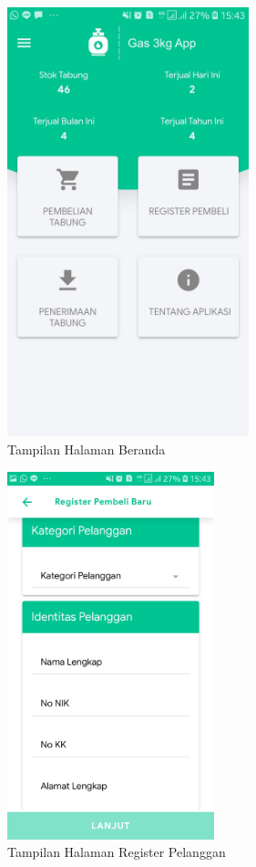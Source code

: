 	\begin{figure}[H]
		\center
		\includegraphics [width = 7cm]{gambar/android/beranda}
		\caption{Tampilan Halaman Beranda}
		\label{tampilanBerandaPangkalan}
	\end{figure}

	\begin{figure}[H]
		\center
		\includegraphics [width = 6cm]{gambar/android/register}
		\caption{Tampilan Halaman Register Pelanggan}
		\label{tampilanRegisterPangkalan}
	\end{figure}

